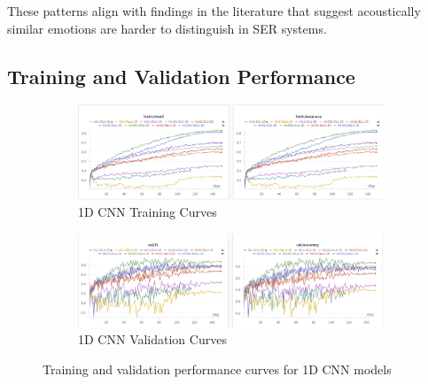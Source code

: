 These patterns align with findings in the literature that suggest acoustically similar emotions are harder to distinguish in SER systems.

\subsection{Training and Validation Performance}

\begin{figure}[h]
    \centering
    \begin{subfigure}[b]{0.48\textwidth}
        \includegraphics[width=\textwidth]{1D/1d-train.png}
        \caption{1D CNN Training Curves}
    \end{subfigure}
    \hfill
    \begin{subfigure}[b]{0.48\textwidth}
        \includegraphics[width=\textwidth]{1D/1d-val.png}
        \caption{1D CNN Validation Curves}
    \end{subfigure}
    \caption{Training and validation performance curves for 1D CNN models}
    \label{fig:1d_training_curves}
\end{figure}

